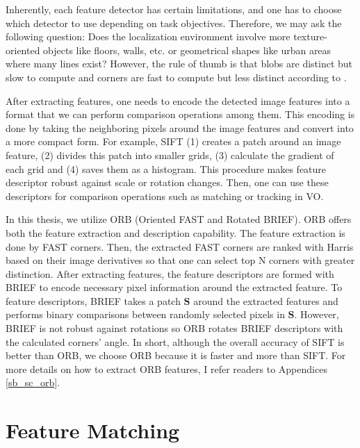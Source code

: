 \documentclass[12pt]{report}
\numberwithin{figure}{section}
\begin{document}
Inherently, each feature detector has certain limitations, and one has to 
choose which detector to use depending on task objectives. Therefore, we may 
ask the following question: Does the localization environment involve more 
texture-oriented objects like floors, walls, etc. or geometrical shapes like 
urban areas where many lines exist?  However, the rule of thumb is that blobs 
are distinct but slow to compute and corners are fast to compute but less 
distinct according to \parencite{Fraundorfer2012}. 

After extracting features, one needs to encode the detected image features 
into a format that we can perform comparison operations among them. 
This encoding is done by taking the neighboring pixels around the image 
features and 
convert into a more compact form. For example, SIFT (1) creates a patch around 
an 
image feature, (2) divides this patch into 
smaller grids, (3) calculate the gradient of each grid and (4) saves them as a 
histogram.  This procedure makes feature descriptor robust against scale or 
rotation changes. Then, one can use these descriptors for comparison 
operations such as matching or tracking in VO. 

In this thesis, we utilize ORB (Oriented FAST and Rotated BRIEF). ORB offers 
both the feature extraction and description capability. The feature 
extraction is done by FAST corners. Then, the extracted FAST corners are 
ranked with Harris based on their image derivatives so that one can select 
top N corners with greater distinction. After extracting features, the 
feature descriptors are formed with BRIEF to encode necessary pixel 
information around the extracted feature. To feature descriptors, BRIEF takes 
a patch $\mathbf{S}$ around the extracted features and performs binary 
comparisons between randomly selected pixels in $\mathbf{S}$. 
However, BRIEF is not robust against rotations so ORB rotates BRIEF 
descriptors with the calculated corners' angle. In short, although the overall 
accuracy 
of SIFT is better than ORB, we choose ORB because it is faster and more than 
SIFT. For more details on how to extract ORB features, I refer readers to 
Appendices \ref{sb_sc_orb}.


\section{Feature Matching} \label{sc_feature_matching}
\end{document}
